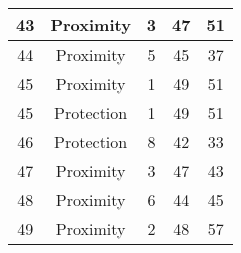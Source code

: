 \documentclass[results.tex]{subfiles}
\begin{document}
\begin{center}
\begin{tabular}{| c || c | c | c | c |}
    \hline
    43 & Proximity & 3 & 47 & 51 \\ 
    \hline
    44 & Proximity & 5 & 45 & 37 \\ 
    \hline
    45 & Proximity & 1 & 49 & 51 \\ 
    \hline
    45 & Protection & 1 & 49 & 51 \\ 
    \hline
    46 & Protection & 8 & 42 & 33 \\ 
    \hline
    47 & Proximity & 3 & 47 & 43 \\ 
    \hline
    48 & Proximity & 6 & 44 & 45 \\ 
    \hline
    49 & Proximity & 2 & 48 & 57 \\ 
    \hline   \end{tabular}
\end{center}
\end{document}
